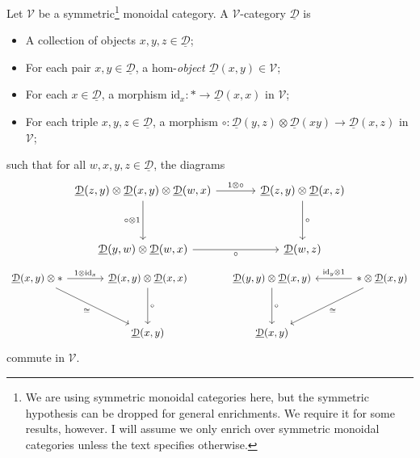 \begin{definition}\label{dfn:3.1}
	Let $\mathcal{V} $ be a symmetric\footnote{We are using symmetric monoidal categories here, but the symmetric hypothesis can be dropped for general enrichments. We require it for some results, however. I will assume we only enrich over symmetric monoidal categories unless the text specifies otherwise.} monoidal category. A $\mathcal{V} $-category $\underline{\mathcal{D} }$ is
	\begin{itemize}
		\item A collection of objects $x,y,z\in \underline{\mathcal{D}} $;
		\item For each pair $x,y\in \underline{\mathcal{D} }$, a hom-\emph{object} $\underline{\mathcal{D} }(x,y)\in \mathcal{V} $;
		\item For each $x\in\underline{\mathcal{D} }$, a morphism $\mathrm{id}_x : * \to \underline{\mathcal{D} }(x,x)$ in $\mathcal{V} $;
		\item For each triple $x,y,z\in\underline{\mathcal{D} }$, a morphism $\circ : \underline{\mathcal{D} }(y,z)\otimes \underline{\mathcal{D} }(xy) \to \underline{\mathcal{D} }(x,z)$ in $\mathcal{V} $;
	\end{itemize}
	such that for all $w,x,y,z\in\underline{\mathcal{D} }$, the diagrams
	\[\begin{tikzcd}[row sep = 3.5em, column sep = 3.5em]
		\underline{\mathcal{D} }(z,y)\otimes \underline{\mathcal{D} }(x,y)\otimes \underline{\mathcal{D} }(w,x)\ar[" 1\otimes \circ  ", r] \ar[" \circ \otimes 1 "', d]  & \underline{\mathcal{D} }(z,y)\otimes \underline{\mathcal{D} }(x,z)\ar[" \circ  ", d]  \\
		\underline{\mathcal{D} }(y,w)\otimes \underline{\mathcal{D} }(w,x)\ar[" \circ  "', r]  & \underline{\mathcal{D} }(w,z)
	\end{tikzcd}\]
	\[\begin{tikzcd}[row sep = 3.5em, column sep = 3.5em]
		\underline{\mathcal{D} }(x,y)\otimes *\ar[" 1\otimes \mathrm{id}_x ", r] \ar[" \cong "', dr]  & \underline{\mathcal{D} }(x,y)\otimes \underline{\mathcal{D} }(x,x)\ar[" \circ  ", d]  & \underline{\mathcal{D} }(y,y)\otimes \underline{\mathcal{D} }(x,y)\ar[" \circ  ", d]  & *\otimes \underline{\mathcal{D} }(x,y)\ar[" \mathrm{id} _y \otimes 1 "', l] \ar[" \cong ", dl]  \\
													      & \underline{\mathcal{D} }(x,y) & \underline{\mathcal{D} }(x,y) & 
	\end{tikzcd}\]
	commute in $\mathcal{V}$.
\end{definition}

